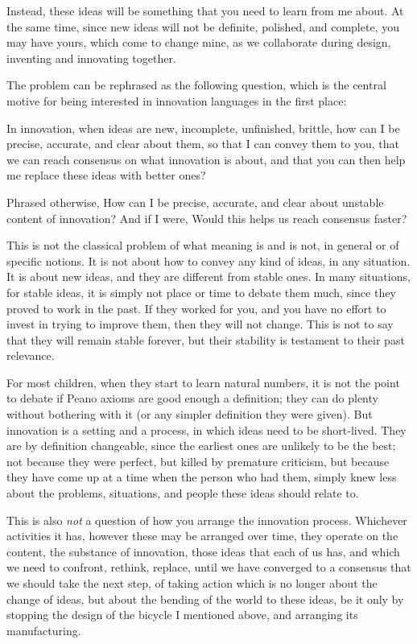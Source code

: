 \documentclass[graybox,envcountchap,sectrefs]{svmono}
\begin{document}
Instead, these ideas will be something that you need to learn from me about. At the same time, since new ideas will not be definite, polished, and complete, you may have yours, which come to change mine, as we collaborate during design, inventing and innovating together.

The problem can be rephrased as the following question, which is the central motive for being interested in innovation languages in the first place:

In innovation, when ideas are new, incomplete, unfinished, brittle, how can I be precise, accurate, and clear about them, so that I can convey them to you, that we can reach consensus on what innovation is about, and that you can then help me replace these ideas with better ones? 

Phrased otherwise, How can I be precise, accurate, and clear about unstable content of innovation? And if I were, Would this helps us reach consensus faster?

This is not the classical problem of what meaning is and is not, in general or of specific notions. It is not about how to convey any kind of ideas, in any situation. It is about new ideas, and they are different from stable ones. In many situations, for stable ideas, it is simply not place or time to debate them much, since they proved to work in the past. If they worked for you, and you have no effort to invest in trying to improve them, then they will not change. This is not to say that they will remain stable forever, but their stability is testament to their past relevance. 

For most children, when they start to learn natural numbers, it is not the point to debate if Peano axioms are good enough a definition; they can do plenty without bothering with it (or any simpler definition they were given). But innovation is a setting and a process, in which ideas need to be short-lived. They are by definition changeable, since the earliest ones are unlikely to be the best; not because they were perfect, but killed by premature criticism, but because they have come up at a time when the person who had them, simply knew less about the problems, situations, and people these ideas should relate to. 

This is also \textit{not} a question of how you arrange the innovation process. Whichever activities it has, however these may be arranged over time, they operate on the content, the substance of innovation, those ideas that each of us has, and which we need to confront, rethink, replace, until we have converged to a consensus that we should take the next step, of taking action which is no longer about the change of ideas, but about the bending of the world to these ideas, be it only by stopping the design of the bicycle I mentioned above, and arranging its manufacturing. 
\end{document}
